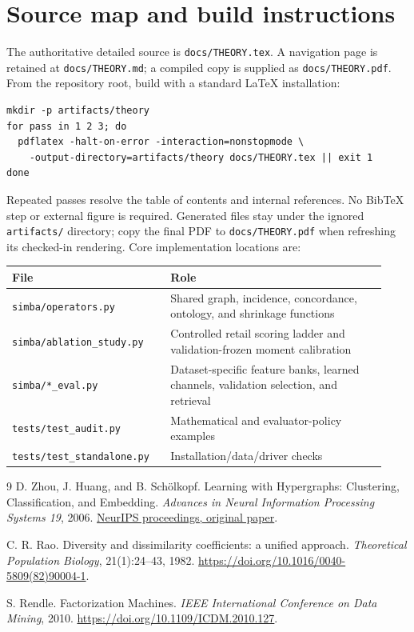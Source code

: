 \documentclass[11pt,a4paper]{article}
\theoremstyle{remark}
\newcommand{\code}[1]{\texttt{\small #1}}
\begin{document}
\section{Source map and build instructions}
The authoritative detailed source is \code{docs/THEORY.tex}. A navigation
page is retained at \code{docs/THEORY.md}; a compiled copy is supplied as
\code{docs/THEORY.pdf}. From the repository root, build with a standard
LaTeX installation:
\begin{verbatim}
mkdir -p artifacts/theory
for pass in 1 2 3; do
  pdflatex -halt-on-error -interaction=nonstopmode \
    -output-directory=artifacts/theory docs/THEORY.tex || exit 1
done
\end{verbatim}
Repeated passes resolve the table of contents and internal references.
No BibTeX step or external figure is required. Generated files stay under
the ignored \code{artifacts/} directory; copy the final PDF to
\code{docs/THEORY.pdf} when refreshing its checked-in rendering.
Core implementation locations are:
\begin{center}
\begin{tabular}{@{}p{0.39\linewidth}p{0.54\linewidth}@{}}
\toprule
File & Role \\
\midrule
\code{simba/operators.py} & Shared graph, incidence, concordance, ontology,
and shrinkage functions \\
\code{simba/ablation\_study.py} & Controlled retail scoring ladder and
validation-frozen moment calibration \\
\code{simba/*\_eval.py} & Dataset-specific feature banks, learned channels,
validation selection, and retrieval \\
\code{tests/test\_audit.py} & Mathematical and evaluator-policy examples \\
\code{tests/test\_standalone.py} & Installation/data/driver checks \\
\bottomrule
\end{tabular}
\end{center}

\begin{thebibliography}{9}
D. Zhou, J. Huang, and B. Sch\"olkopf.
Learning with Hypergraphs: Clustering, Classification, and Embedding.
\emph{Advances in Neural Information Processing Systems 19}, 2006.
\href{https://papers.nips.cc/paper_files/paper/2006/hash/dff8e9c2ac33381546d96deea9922999-Abstract.html}
{NeurIPS proceedings, original paper}.

C. R. Rao. Diversity and dissimilarity coefficients: a unified approach.
\emph{Theoretical Population Biology}, 21(1):24--43, 1982.
\url{https://doi.org/10.1016/0040-5809(82)90004-1}.

S. Rendle. Factorization Machines.
\emph{IEEE International Conference on Data Mining}, 2010.
\url{https://doi.org/10.1109/ICDM.2010.127}.
\end{thebibliography}
\end{document}
